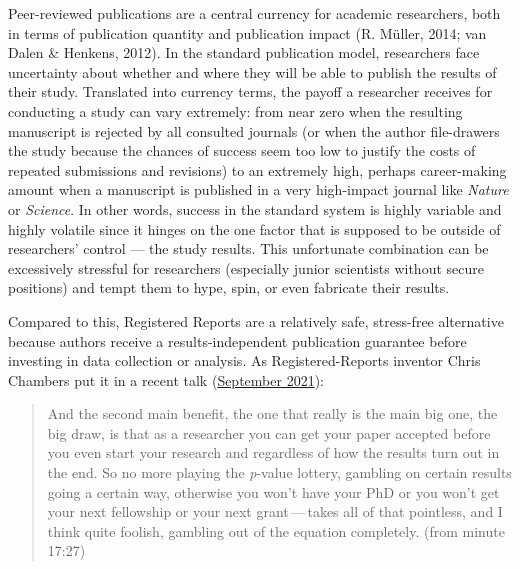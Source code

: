 \documentclass[
  ,man,mask,floatsintext]{apa6}
\begin{document}
Peer-reviewed publications are a central currency for academic researchers, both in terms of publication quantity and publication impact (R. Müller, 2014; van Dalen \& Henkens, 2012).
In the standard publication model, researchers face uncertainty about whether and where they will be able to publish the results of their study. Translated into currency terms, the payoff a researcher receives for conducting a study can vary extremely:
from near zero when the resulting manuscript is rejected by all consulted journals (or when the author file-drawers the study because the chances of success seem too low to justify the costs of repeated submissions and revisions) to an extremely high, perhaps career-making amount when a manuscript is published in a very high-impact journal like \emph{Nature} or \emph{Science}.
In other words, success in the standard system is highly variable and highly volatile since it hinges on the one factor that is supposed to be outside of researchers' control --- the study results.
This unfortunate combination can be excessively stressful for researchers (especially junior scientists without secure positions) and tempt them to hype, spin, or even fabricate their results.

Compared to this, Registered Reports are a relatively safe, stress-free alternative because authors receive a results-independent publication guarantee before investing in data collection or analysis.
As Registered-Reports inventor Chris Chambers put it in a recent talk (\href{https://youtu.be/FiVI3cwVMZI?list=PLChfyH8TVDGmYENpXUDPaeeq2SLh8q9dt\&t=1047}{September 2021}):

\begin{quote}
And the second main benefit, the one that really is the main big one, the big draw, is that as a researcher you can get your paper accepted before you even start your research and regardless of how the results turn out in the end. So no more playing the \emph{p}-value lottery, gambling on certain results going a certain way, otherwise you won't have your PhD or you won't get your next fellowship or your next grant\(\,\)---\(\,\)takes all of that pointless, and I think quite foolish, gambling out of the equation completely. (from minute 17:27)
\end{quote}
\end{document}
